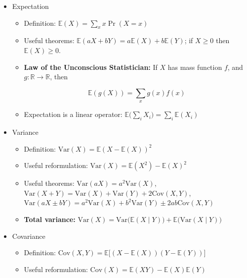 \documentclass{article}
\newcommand{\E}{\mathbb{E}}
\newcommand{\Var}{\mathrm{Var}}
\newcommand{\Cov}{\mathrm{Cov}}
\begin{document}
\begin{itemize}

\item Expectation

\begin{itemize}

\item Definition: \(\E(X) = \sum_x x \Pr(X = x)\)\

\item Useful theorems: \(\E(aX + bY) = a \E(X) + b \E(Y)\); if \(X \geq 0\) then \(\E(X) \geq 0\).

\item \textbf{Law of the Unconscious Statistician:} If \(X\) has mass function \(f\), and \(g: \mathbb{R} \to \mathbb{R}\), then 

\[
\E(g(X)) = \sum_x g(x) f(x)
\]

\item Expectation is a linear operator: \( \E \big(\sum_i X_i \big) = \sum_i \E(X_i)\)



\end{itemize}

\item Variance

\begin{itemize}

\item Definition: \( \Var(X) = \E(X - \E(X))^2\)

\item Useful reformulation: \(\Var(X) = \E(X^2) - \E(X)^2\)

\item Useful theorems: \(\Var(aX) = a^2 \Var(X)\), \(\Var(X + Y) = \Var(X) + \Var(Y) + 2 \Cov(X, Y)\), \(\Var(aX \pm bY) = a^2\Var(X) + b^2\Var(Y) \pm 2ab \Cov(X, Y)\)

\item \textbf{Total variance:} \( \Var(X) = \Var \big( \E(X \mid Y) \big) + \E \big( \Var(X \mid Y) \big) \)

\end{itemize}

\item Covariance

\begin{itemize}

\item Definition: \( \Cov(X, Y ) = \E \big[ (X - \E(X))(Y - \E(Y))\big] \)

\item Useful reformulation: \(\Cov(X) = \E(XY) - \E(X)\E(Y)\)

\end{itemize}

\end{itemize}
\end{document}

